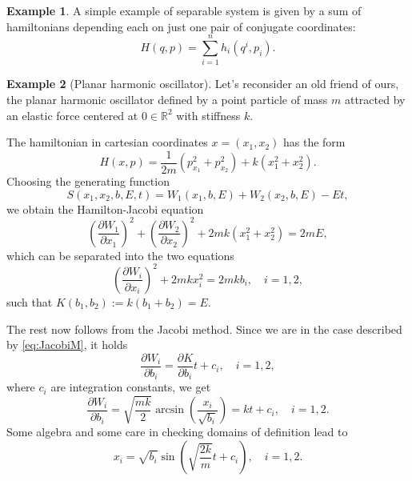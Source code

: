 \documentclass[english,fontsize=11pt,paper=b5]{scrbook}
\numberwithin{equation}{chapter}
\theoremstyle{definition}
\newtheorem{example}{Example}[chapter]
\begin{document}
    \begin{example}
      A simple example of separable system is given by a sum of hamiltonians depending each on just one pair of conjugate coordinates:
      \begin{equation}
        H(q,p) = \sum_{i=1}^n h_i(q^i, p_i).
      \end{equation}
    \end{example}

    \begin{example}[Planar harmonic oscillator]\label{ex:integrabilitypho}
      Let's reconsider an old friend of ours, the planar harmonic oscillator defined by a point particle of mass $m$ attracted by an elastic force centered at $0\in\mathbb{R}^2$ with stiffness $k$.

      The hamiltonian in cartesian coordinates $x=(x_1, x_2)$ has the form
      \begin{equation}
        H(x,p) = \frac{1}{2m}(p_{x_1}^2 + p_{x_2}^2) + k(x_1^2 + x_2^2).
      \end{equation}
      Choosing the generating function
      \begin{equation}
        S(x_1, x_2, b, E, t) = W_1(x_1, b, E) + W_2(x_2, b, E) - E t,
      \end{equation}
      we obtain the Hamilton-Jacobi equation
      \begin{equation}
        \left(\frac{\partial W_1}{\partial x_1}\right)^2
        + \left(\frac{\partial W_2}{\partial x_2}\right)^2
        + 2m k (x_1^2 + x_2^2) = 2m E,
      \end{equation}
      which can be separated into the two equations
      \begin{equation}
        \left(\frac{\partial W_i}{\partial x_i}\right)^2
        + 2m k x_i^2  = 2m k b_i, \quad i=1,2,
      \end{equation}
      such that $K(b_1,b_2) := k(b_1 + b_2) = E$.

      The rest now follows from the Jacobi method.
      Since we are in the case described by \eqref{eq:JacobiM}, it holds
      \begin{equation}
        \frac{\partial W_i}{\partial b_i} = \frac{\partial K}{\partial b_i}t + c_i, \quad i=1,2,
      \end{equation}
      where $c_i$ are integration constants, we get
      \begin{equation}
        \frac{\partial W_i}{\partial b_i} = \sqrt{\frac{mk}{2}}\arcsin\left(\frac{x_i}{\sqrt{b_i}}\right) = kt + c_i, \quad i=1,2.
      \end{equation}
      Some algebra and some care in checking domains of definition lead to
      \begin{equation}
        x_i = \sqrt{b_i} \sin\left(\sqrt{\frac{2k}{m}} t + c_i\right), \quad i=1,2.
      \end{equation}


\end{example}
\end{document}
